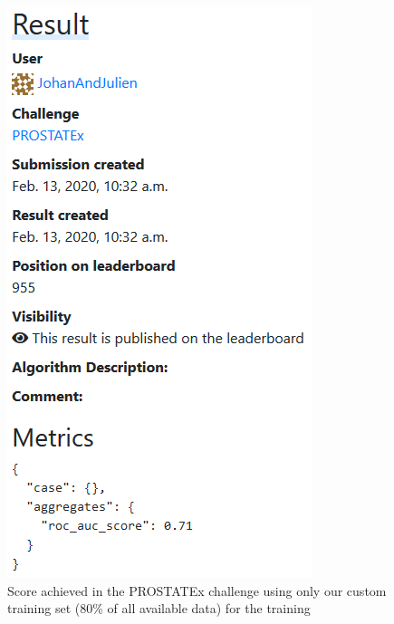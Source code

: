 \begin{figure}[!h]
\centering
\includegraphics[height=0.4\textheight, keepaspectratio=true]{./figures/paper_reproduction_results_challenge1.png}
\caption{Score achieved in the PROSTATEx challenge using only our custom training set (80\% of all available data) for the training}
\label{fig:paper_reprodution_results_challenge_1}
\end{figure}



